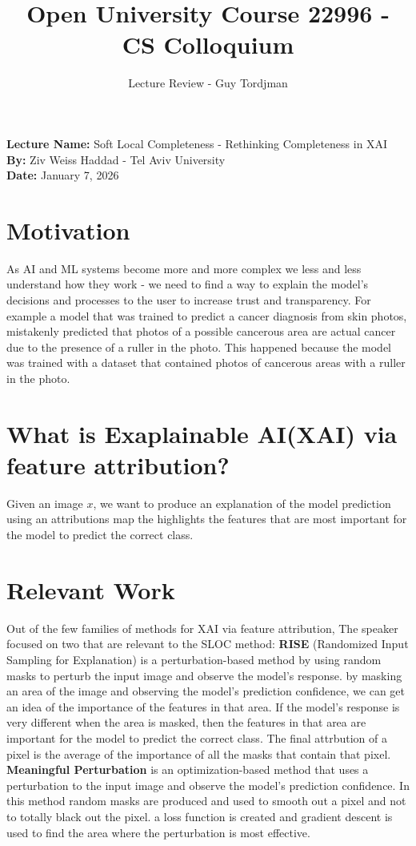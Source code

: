 \documentclass[10pt,a4paper]{article}
\title{\textbf{Open University Course 22996 - CS Colloquium}}
\author{Lecture Review - Guy Tordjman}
\date{}
\begin{document}
\maketitle

\vspace{-15pt}

\noindent\textbf{Lecture Name:} Soft Local Completeness - Rethinking Completeness in XAI \\
\textbf{By:} Ziv Weiss Haddad - Tel Aviv University\\
\textbf{Date:} January 7, 2026 \\

\vspace{8pt}

\section*{Motivation}
As AI and ML systems become more and more complex we less and less understand how they work - we need to find a way to explain the model's decisions and processes to the user to increase trust and transparency.
For example a model that was trained to predict a cancer diagnosis from skin photos, mistakenly predicted that photos of a possible cancerous area are actual cancer due to the presence of a ruller in the photo. This happened because the model was trained with a dataset that contained photos of cancerous areas with a ruller in the photo.

\section*{What is Exaplainable AI(XAI) via feature attribution?}
Given an image $x$, we want to produce an explanation of the model prediction using an attributions map the highlights the features that are most important for the model to predict the correct class.

\section*{Relevant Work}
Out of the few families of methods for XAI via feature attribution, The speaker focused on two that are relevant to the SLOC method:
\textbf{RISE} (Randomized Input Sampling for Explanation) is a perturbation-based method by using random masks to perturb the input image and observe the model's response.
by masking an area of the image and observing the model's prediction confidence, we can get an idea of the importance of the features in that area. If the model's response is very different when the area is masked, then the features in that area are important for the model to predict the correct class. The final attrbution of a pixel is the average of the importance of all the masks that contain that pixel.
\textbf{Meaningful Perturbation} is an optimization-based method that uses a perturbation to the input image and observe the model's prediction confidence. In this method random masks are produced and used to smooth out a pixel and not to totally black out the pixel.
a loss function is created and gradient descent is used to find the area where the perturbation is most effective.
\end{document}
